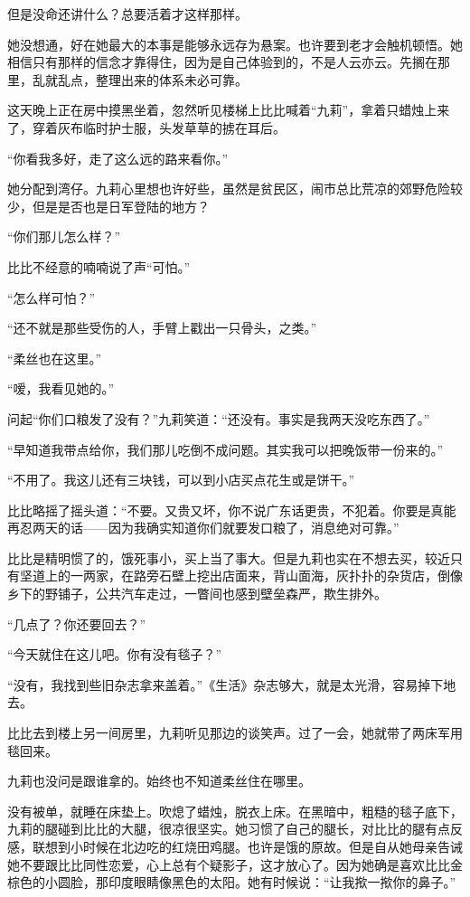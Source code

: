 \par 但是没命还讲什么？总要活着才这样那样。
\par 她没想通，好在她最大的本事是能够永远存为悬案。也许要到老才会触机顿悟。她相信只有那样的信念才靠得住，因为是自己体验到的，不是人云亦云。先搁在那里，乱就乱点，整理出来的体系未必可靠。
\par 这天晚上正在房中摸黑坐着，忽然听见楼梯上比比喊着“九莉”，拿着只蜡烛上来了，穿着灰布临时护士服，头发草草的掳在耳后。
\par “你看我多好，走了这么远的路来看你。”
\par 她分配到湾仔。九莉心里想也许好些，虽然是贫民区，闹市总比荒凉的郊野危险较少，但是是否也是日军登陆的地方？
\par “你们那儿怎么样？”
\par 比比不经意的喃喃说了声“可怕。”
\par “怎么样可怕？”
\par “还不就是那些受伤的人，手臂上戳出一只骨头，之类。”
\par “柔丝也在这里。”
\par “嗳，我看见她的。”
\par 问起“你们口粮发了没有？”九莉笑道：“还没有。事实是我两天没吃东西了。”
\par “早知道我带点给你，我们那儿吃倒不成问题。其实我可以把晚饭带一份来的。”
\par “不用了。我这儿还有三块钱，可以到小店买点花生或是饼干。”
\par 比比略摇了摇头道：“不要。又贵又坏，你不说广东话更贵，不犯着。你要是真能再忍两天的话——因为我确实知道你们就要发口粮了，消息绝对可靠。”
\par 比比是精明惯了的，饿死事小，买上当了事大。但是九莉也实在不想去买，较近只有坚道上的一两家，在路旁石壁上挖出店面来，背山面海，灰扑扑的杂货店，倒像乡下的野铺子，公共汽车走过，一瞥间也感到壁垒森严，欺生排外。
\par “几点了？你还要回去？”
\par “今天就住在这儿吧。你有没有毯子？”
\par “没有，我找到些旧杂志拿来盖着。”《生活》杂志够大，就是太光滑，容易掉下地去。
\par 比比去到楼上另一间房里，九莉听见那边的谈笑声。过了一会，她就带了两床军用毯回来。
\par 九莉也没问是跟谁拿的。始终也不知道柔丝住在哪里。
\par 没有被单，就睡在床垫上。吹熄了蜡烛，脱衣上床。在黑暗中，粗糙的毯子底下，九莉的腿碰到比比的大腿，很凉很坚实。她习惯了自己的腿长，对比比的腿有点反感，联想到小时候在北边吃的红烧田鸡腿。也许是饿的原故。但是自从她母亲告诫她不要跟比比同性恋爱，心上总有个疑影子，这才放心了。因为她确是喜欢比比金棕色的小圆脸，那印度眼睛像黑色的太阳。她有时候说：“让我揿一揿你的鼻子。”
